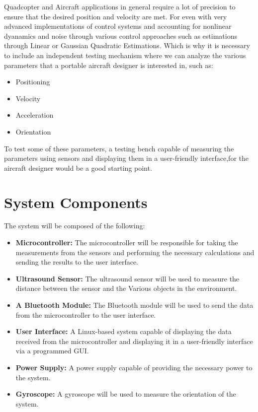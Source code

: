 \documentclass[12pt]{article}
\numberwithin{equation}{section}
\begin{document}
Quadcopter and Aircraft applications in general require a lot of precision to ensure that the desired position and velocity are met. For even with very advanced implementations of control systems and accounting for nonlinear dyanamics and noise through various control approaches such as estimations through Linear or Gaussian Quadratic Estimations. Which is why it is necessary to include an independent testing mechanism where we can analyze the various parameters that a portable aircraft designer is interested in, such as:

\begin{itemize}
  \item Positioning
  \item Velocity
  \item Acceleration
  \item Orientation
\end{itemize}

To test some of these parameters, a testing bench capable of measuring the parameters using sensors and displaying them in a user-friendly interface,for the aircraft designer would be a good starting point.

\section{System Components}
The system will be composed of the following:
\begin{itemize}
  \item \textbf{Microcontroller:} The microcontroller will be responsible for taking the measurements from the sensors and performing the necessary calculations and sending the results to the user interface.
  \item \textbf{Ultrasound Sensor:} The ultrasound sensor will be used to measure the distance between the sensor and the Various objects in the environment.
  \item \textbf{A Bluetooth Module:} The Bluetooth module will be used to send the data from the microcontroller to the user interface.
  \item \textbf{User Interface:} A Linux-based system capable of displaying the data received from the microcontroller and displaying it in a user-friendly interface via a programmed GUI.
  \item \textbf{Power Supply:} A power supply capable of providing the necessary power to the system.
  \item \textbf{Gyroscope:} A gyroscope will be used to measure the orientation of the system.
\end{itemize}
\end{document}
